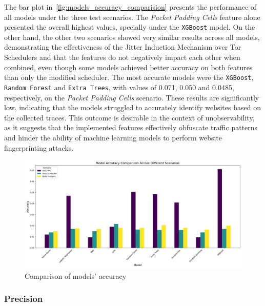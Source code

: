 The bar plot in~\autoref{fig:models_accuracy_comparision} presents the performance of all models under the three test scenarios. The \textit{Packet Padding Cells} feature alone presented the overall highest values, specially under the \texttt{XGBoost} model. On the other hand, the other two scenarios showed very similar results across all models, demonstrating the effectiveness of the Jitter Induction Mechanism over Tor Schedulers and that the features do not negatively impact each other when combined, even though some models achieved better accuracy on both features than only the modified scheduler. 
The most accurate models were the \texttt{XGBoost}, \texttt{Random Forest} and \texttt{Extra Trees}, with values of 0.071, 0.050 and 0.0485, respectively, on the \textit{Packet Padding Cells} scenario. These results are significantly low, indicating that the models struggled to accurately identify websites based on the collected traces. This outcome is desirable in the context of unobservability, as it suggests that the implemented features effectively obfuscate traffic patterns and hinder the ability of machine learning models to perform website fingerprinting attacks. 

\begin{figure}[!h]
  \centering
  \includegraphics[width=\textwidth]{Chapters/Figures/Plots/obs-no-control/obs_Accuracy_comparison.png}
  \caption{Comparison of models' accuracy}\label{fig:models_accuracy_comparision}
\end{figure}
\FloatBarrier

\subsubsection{Precision}

